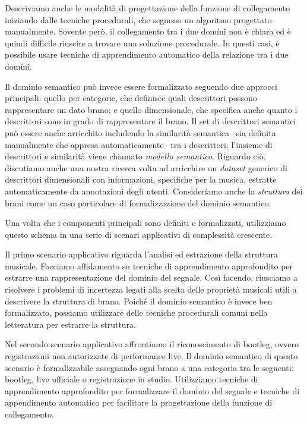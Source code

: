 Descriviamo anche le modalit\`a di progettazione della funzione di collegamento iniziando dalle tecniche procedurali, che seguono un algoritmo progettato manualmente. Sovente per\`o, il collegamento tra i due dom\'in\^i non \`e chiara ed \`e quindi difficile riuscire a trovare una soluzione procedurale. In questi casi, \`e possibile usare tecniche di apprendimento automatico della relazione tra i due dom\'in\^i. 

Il dominio semantico pu\`o invece essere formalizzato seguendo due approcci principali: quello per categorie, che definisce quali descrittori possono rappresentare un dato brano; e quello dimensionale, che specifica anche quanto i descrittori sono in grado di rappresentare il brano. Il set di descrittori semantici pu\`o essere anche arricchito includendo la similarit\`a semantica --sia definita manualmente che appresa automaticamente-- tra i descrittori; l'insieme di descrittori e similarit\`a viene chiamato \textit{modello semantico}. Riguardo ci\`o, discutiamo anche una nostra ricerca volta ad arricchire un \textit{dataset} generico di descrittori dimensionali con informazioni, specifiche per la musica, estratte automaticamente da annotazioni degli utenti. Consideriamo anche la \textit{struttura} dei brani come un caso particolare di formalizzazione del dominio semantico.

Una volta che i componenti principali sono definiti e formalizzati, utilizziamo questo schema in una serie di scenari applicativi di complessit\`a crescente.

Il primo scenario applicativo riguarda l'analisi ed estrazione della struttura musicale. Facciamo affidamento su tecniche di apprendimento approfondito per estrarre una rappresentazione del dominio del segnale. Cos\`i facendo, riusciamo a risolvere i problemi di incertezza legati alla scelta delle propriet\`a musicali utili a descrivere la struttura di brano. Poich\'e il dominio semantico \`e invece ben formalizzato, possiamo utilizzare delle tecniche procedurali comuni nella letteratura per estrarre la struttura.

Nel secondo scenario applicativo affrontiamo il riconoscimento di bootleg, ovvero registrazioni non autorizzate di performance live. Il dominio semantico di questo scenario \`e formalizzabile assegnando ogni brano a una categoria tra le seguenti: bootleg, live ufficiale o registrazione in studio. Utilizziamo tecniche di apprendimento approfondito per formalizzare il dominio del segnale e tecniche di appendimento automatico per facilitare la progettazione della funzione di collegamento.


